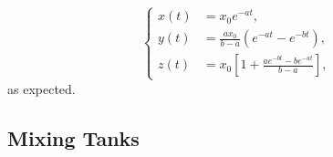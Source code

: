 \[
	\begin{cases}
		x(t) &= x_0 e^{-a t}, \\[6pt]
		y(t) &= \frac{a x_0}{b - a} \left( e^{-a t} - e^{-b t} \right), \\[6pt]
		z(t) &= x_0 \left[ 1 + \frac{a e^{-b t} - b e^{-a t}}{b - a} \right],
	\end{cases}
\]
as expected.

\subsection{Mixing Tanks}


%	
%		
%		
%		
%		
%		
%		
%		
	


